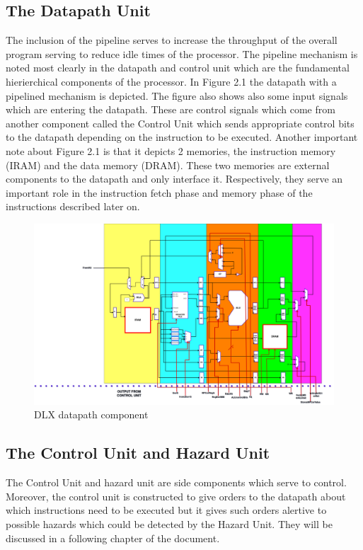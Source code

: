 	\subsection{ The Datapath Unit }
    \indent The inclusion of the pipeline serves to increase the throughput of the overall program serving to reduce idle times of the processor. 
    The pipeline mechanism is noted most clearly in the datapath and control unit which are the fundamental hierierchical components of the processor.
    In Figure 2.1 the datapath with a pipelined mechanism is depicted. The figure also shows also some input signals which are entering the datapath. 
	These are control signals which come from another component called the Control Unit which sends appropriate control bits to the datapath depending on the instruction to be executed.
	Another important note about Figure 2.1 is that it depicts 2 memories, the instruction memory (IRAM) and the data memory (DRAM). These two memories
	are external components to the datapath and only interface it. Respectively, they serve an important role in the instruction fetch phase and memory phase of the instructions described later on.
    \begin{figure}[h!]
        \centering
        \includegraphics[scale = 0.15]
		{chapters/figures/DLXdatapath}
        \caption{DLX datapath component}
        \label{fig:datapathPic}
        \end{figure}

	\subsection{ The Control Unit and Hazard Unit }
	The Control Unit and hazard unit are side components which serve to control. Moreover, the control unit is constructed to give orders to the
	datapath about which instructions need to be executed but it gives such orders alertive to possible hazards which could be detected by the Hazard Unit. They will be discussed in a following chapter of the document.

